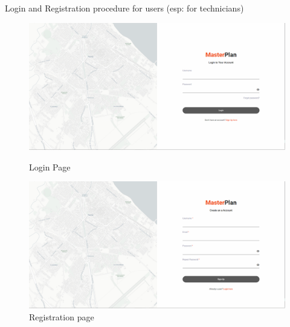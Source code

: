 Login and Registration procedure for users (esp: for technicians)
\begin{figure}[H]
    \centering
    \begin{minipage}{0.48\textwidth}
        \centering
        \includegraphics[width=\textwidth]{res/web/2-register}
        \caption{Login Page}
        \label{fig:web-login}
    \end{minipage}
    \hfill
    \begin{minipage}{0.48\textwidth}
        \centering
        \includegraphics[width=\textwidth]{res/web/3-register}
        \caption{Registration page}
        \label{fig:web-register}
    \end{minipage}
\end{figure}


